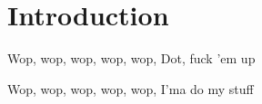 \section{Introduction}
\label{sec:intro}

Wop, wop, wop, wop, wop, Dot, fuck 'em up

Wop, wop, wop, wop, wop, I'ma do my stuff
\cite{Lamar_2024}